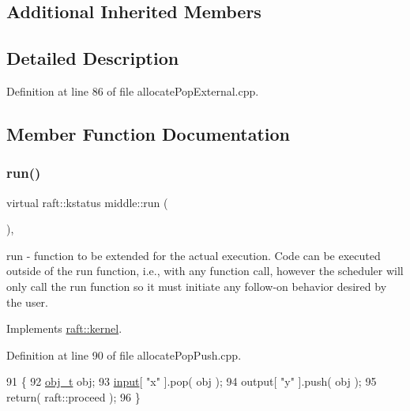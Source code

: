 \subsection*{Additional Inherited Members}


\subsection{Detailed Description}


Definition at line 86 of file allocate\+Pop\+External.\+cpp.



\subsection{Member Function Documentation}
\hypertarget{classmiddle_a9aa7415c102af751be9c7af4771b6f16}{}\label{classmiddle_a9aa7415c102af751be9c7af4771b6f16} 
\subsubsection{\texorpdfstring{run()}{run()}\hspace{0.1cm}{\footnotesize\ttfamily [1/4]}}
{\footnotesize\ttfamily virtual raft\+::kstatus middle\+::run (\begin{DoxyParamCaption}{ }\end{DoxyParamCaption})\hspace{0.3cm}{\ttfamily [inline]}, {\ttfamily [virtual]}}

run -\/ function to be extended for the actual execution. Code can be executed outside of the run function, i.\+e., with any function call, however the scheduler will only call the run function so it must initiate any follow-\/on behavior desired by the user. 

Implements \hyperlink{classraft_1_1kernel_a05094286d7577360fb1b91c91fc05901}{raft\+::kernel}.



Definition at line 90 of file allocate\+Pop\+Push.\+cpp.


\begin{DoxyCode}
91     \{
92         \hyperlink{structfoo}{obj\_t} obj;
93         \hyperlink{classraft_1_1kernel_a6edbe35a56409d402e719b3ac36d6554}{input}[ \textcolor{stringliteral}{"x"} ].pop( obj );
94         output[ \textcolor{stringliteral}{"y"} ].push( obj );
95         \textcolor{keywordflow}{return}( raft::proceed );
96     \}
\end{DoxyCode}
\hypertarget{classmiddle_a9aa7415c102af751be9c7af4771b6f16}{}\label{classmiddle_a9aa7415c102af751be9c7af4771b6f16} 
